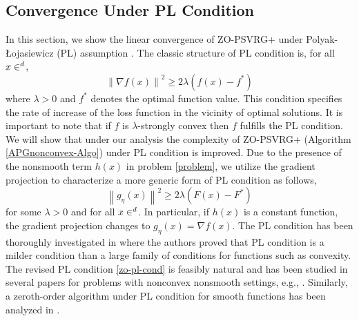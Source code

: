 \documentclass[iicol,sn-basic]{sn-jnl}
\theoremstyle{thmstyleone}%
\theoremstyle{thmstyletwo}%
\newtheorem{remark}{Remark}%
\theoremstyle{thmstylethree}%
\let\R\relax
\newcommand*{\R}{\mathbb{R}}
\newcommand{\norm}[1]{\left\lVert#1\right\rVert}
\begin{document}
\subsection{Convergence Under PL Condition}
In this section, we show the linear convergence of ZO-PSVRG+ under Polyak-Łojasiewicz (PL) assumption \cite{polyak1963gradient}.
The classic structure of PL condition is, for all $x\in\R^d$,
\begin{equation}
\norm{\nabla f(x)}^2 \geq 2\lambda (f(x) - f^*)
\end{equation}
where $\lambda >0$ and $f^*$ denotes the optimal function value. This condition specifies the rate of increase of the loss function in the vicinity of optimal solutions. It is important to note that if $f$ is $\lambda$-strongly convex then $f$ fulfills the PL condition. We will show that under our analysis the complexity of ZO-PSVRG+ (Algorithm \ref{APGnonconvex-Algo}) under PL condition is improved.
Due to the presence of the nonsmooth term $h(x)$ in problem \eqref{problem}, we utilize the gradient projection to characterize a more generic form of PL condition as follows, 
\begin{equation}\label{zo-pl-cond}
\norm{g_{\eta}(x)}^2 \geq 2\lambda (F(x) - F^*)
\end{equation}
for some $\lambda >0$ and for all $x\in\R^d$. In particular, if $h(x)$ is a constant function, the gradient projection changes to $g_{\eta}(x) = \nabla f(x)$.
The PL condition has been thoroughly investigated  in \cite{karimi2016linear} where the authors proved that PL condition is a milder condition than a large family of conditions for functions such as convexity. The revised PL condition \eqref{zo-pl-cond} is feasibly natural and has been studied in several papers for problems with nonconvex nonsmooth settings, e.g., \cite{li2018simple}. Similarly, a zeroth-order algorithm under PL condition for smooth functions has been analyzed in \cite{ji2019improved}.
\end{document}
